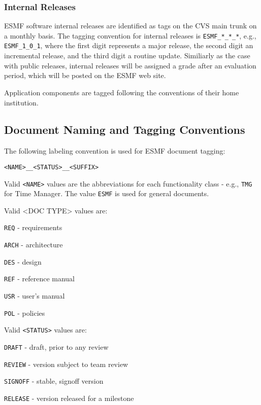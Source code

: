 \subsubsection{Internal Releases}
ESMF software internal releases are identified as tags on the CVS main trunk on a monthly basis.
The tagging convention for internal releases is
{\tt ESMF\_*\_*\_*}, e.g., {\tt ESMF\_1\_0\_1}, where the first digit represents a 
major release, the second digit an incremental release, and the third digit a routine update.
Similiarly as the case with public releases, internal releases will be assigned a grade
after an evaluation period, which will be posted on the ESMF web site.

Application components are tagged following the conventions of their
home institution.

\subsection{Document Naming and Tagging Conventions}

The following labeling convention is used for ESMF document tagging:

{\tt <NAME>\_<DOC TYPE>\_<STATUS>\_<TARGET MILESTONE>\_<SUFFIX>}

\noindent Valid {\tt <NAME>} values are the abbreviations for each functionality 
class - e.g., {\tt TMG} for Time Manager.  The value {\tt ESMF} is used 
for general documents.

\noindent Valid <DOC TYPE> values are:
\begin{description}
  \item {\tt REQ} - requirements 
  \item {\tt ARCH} - architecture
  \item {\tt DES} - design
  \item {\tt REF} - reference manual
  \item {\tt USR} - user's manual
  \item {\tt POL} - policies 
\end{description}

\noindent Valid {\tt <STATUS>} values are:
\begin{description}
  \item {\tt DRAFT} - draft, prior to any review 
  \item {\tt REVIEW} - version subject to team review
  \item {\tt SIGNOFF} - stable, signoff version
  \item {\tt RELEASE} - version released for a milestone
\end{description}

